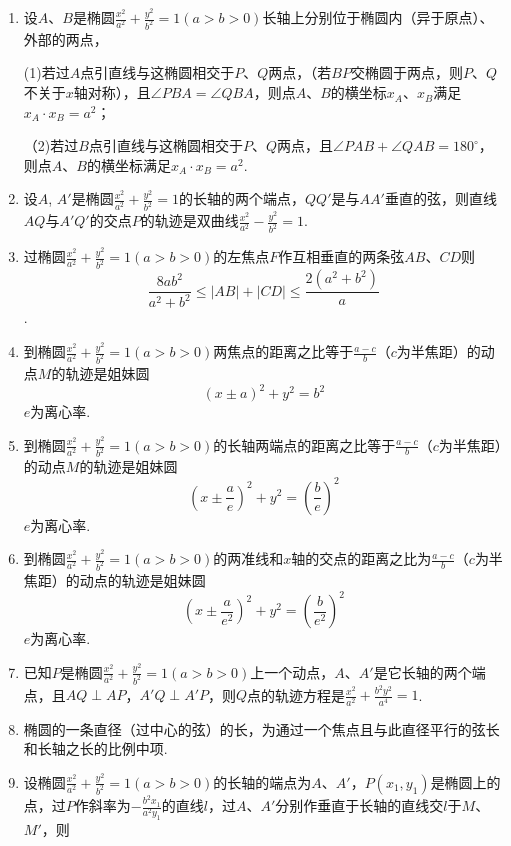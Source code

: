 \documentclass{article}
\begin{document}
\begin{enumerate}[label=\arabic*.]
\item 设$A$、$B$是椭圆$\frac{x^2}{a^2} + \frac{y^2}{b^2} = 1 \left(a > b > 0\right)$长轴上分别位于椭圆内（异于原点）、外部的两点，

(1)若过$A$点引直线与这椭圆相交于$P$、$Q$两点，（若$BP$交椭圆于两点，则$P$、$Q$不关于$x$轴对称），且$\angle PBA=\angle QBA$，则点$A$、$B$的横坐标$x_A$、$x_B$满足$x_A\cdot x_B=a^2$；

（2)若过$B$点引直线与这椭圆相交于$P$、$Q$两点，且$\angle PAB+\angle QAB=180^\circ$，则点$A$、$B$的横坐标满足$x_A\cdot x_B=a^2$. 

\item 设$A$, $A'$是椭圆$\frac{x^2}{a^2} + \frac{y^2}{b^2} = 1$的长轴的两个端点，$QQ'$是与$AA'$垂直的弦，则直线$AQ$与$A'Q'$的交点$P$的轨迹是双曲线$\frac{x^2}{a^2}-\frac{y^2}{b^2}=1$. 

\item 过椭圆$\frac{x^2}{a^2} + \frac{y^2}{b^2} = 1 \left(a > b > 0\right)$的左焦点$F$作互相垂直的两条弦$AB$、$CD$则$$\frac{8ab^2}{a^2+b^2}\leq\left|AB\right| + \left|CD\right|\leq\frac{2\left(a^2+b^2\right)}{a}$$. 

\item 到椭圆$\frac{x^2}{a^2} + \frac{y^2}{b^2} = 1 \left(a > b > 0\right)$两焦点的距离之比等于$\frac{a-c}{b}$（$c$为半焦距）的动点$M$的轨迹是姐妹圆$$\left(x\pm a\right)^2+y^2=b^2$$
$e$为离心率. 

\item 到椭圆$\frac{x^2}{a^2} + \frac{y^2}{b^2} = 1 \left(a > b > 0\right)$的长轴两端点的距离之比等于$\frac{a-c}{b}$（$c$为半焦距）的动点$M$的轨迹是姐妹圆$$\left(x\pm \frac{a}{e}\right)^2+y^2=\left(\frac{b}{e}\right)^2$$
$e$为离心率. 

\item 到椭圆$\frac{x^2}{a^2} + \frac{y^2}{b^2} = 1 \left(a > b > 0\right)$的两准线和$x$轴的交点的距离之比为$\frac{a-c}{b}$（$c$为半焦距）的动点的轨迹是姐妹圆$$\left(x\pm \frac{a}{e^2}\right)^2+y^2=\left(\frac{b}{e^2}\right)^2$$
$e$为离心率. 

\item 已知$P$是椭圆$\frac{x^2}{a^2} + \frac{y^2}{b^2} = 1 \left(a > b > 0\right)$上一个动点，$A$、$A'$是它长轴的两个端点，且$AQ\perp AP$，$A'Q\perp A'P$，则$Q$点的轨迹方程是$\frac{x^2}{a^2} + \frac{b^2y^2}{a^4} = 1$. 

\item 椭圆的一条直径（过中心的弦）的长，为通过一个焦点且与此直径平行的弦长和长轴之长的比例中项. 

\item 设椭圆$\frac{x^2}{a^2} + \frac{y^2}{b^2} = 1 \left(a > b > 0\right)$的长轴的端点为$A$、$A'$，$P(x_1,y_1)$是椭圆上的点，过$P$作斜率为$-\frac{b^2x_1}{a^2y_1}$的直线$l$，过$A$、$A'$分别作垂直于长轴的直线交$l$于$M$、$M'$，则


\end{enumerate}
\end{document}
